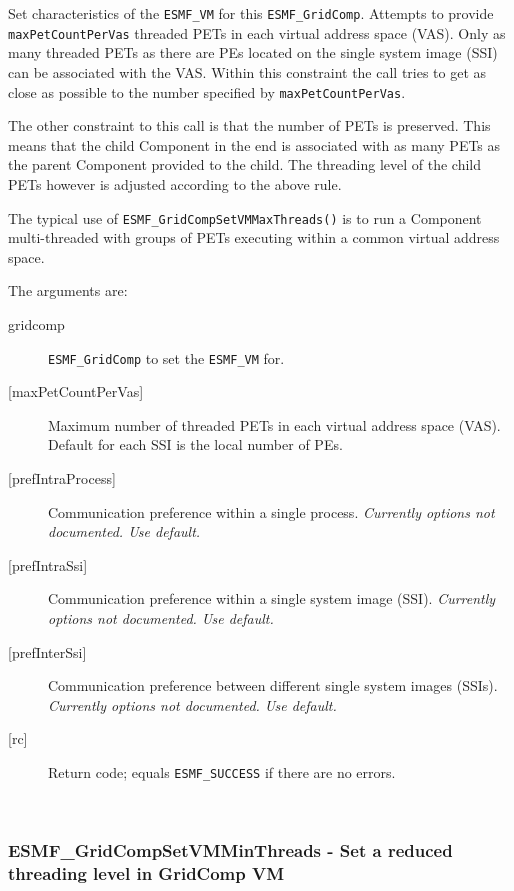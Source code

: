      Set characteristics of the {\tt ESMF\_VM} for this {\tt ESMF\_GridComp}.
     Attempts to provide {\tt maxPetCountPerVas} threaded PETs in each
     virtual address space (VAS). Only as many threaded PETs as there are PEs
     located on the single system image (SSI) can be associated with the VAS.
     Within this constraint the call tries to get as close as possible to the
     number specified by {\tt maxPetCountPerVas}.
  
     The other constraint to this call is that the number of PETs is preserved.
     This means that the child Component in the end is associated with as many
     PETs as the parent Component provided to the child. The threading level of
     the child PETs however is adjusted according to the above rule.
  
     The typical use of {\tt ESMF\_GridCompSetVMMaxThreads()} is to run a
     Component multi-threaded with groups of PETs executing within a common
     virtual address space.
  
   The arguments are:
   \begin{description}
   \item[gridcomp]
     {\tt ESMF\_GridComp} to set the {\tt ESMF\_VM} for.
   \item[{[maxPetCountPerVas]}]
     Maximum number of threaded PETs in each virtual address space (VAS).
     Default for each SSI is the local number of PEs.
   \item[{[prefIntraProcess]}]
     Communication preference within a single process.
     {\em Currently options not documented. Use default.}
   \item[{[prefIntraSsi]}]
     Communication preference within a single system image (SSI).
     {\em Currently options not documented. Use default.}
   \item[{[prefInterSsi]}]
     Communication preference between different single system images (SSIs).
     {\em Currently options not documented. Use default.}
   \item[{[rc]}]
     Return code; equals {\tt ESMF\_SUCCESS} if there are no errors.
   \end{description}
   
 
\mbox{}\hrulefill\ 
 
\subsubsection [ESMF\_GridCompSetVMMinThreads] {ESMF\_GridCompSetVMMinThreads - Set a reduced threading level in GridComp VM}


